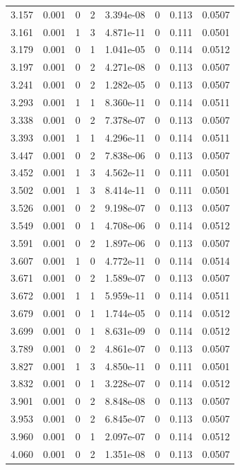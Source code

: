 \documentclass[preview]{standalone}
\begin{document}
{{{\begin{tabular}{L{1.2cm}C{1.2cm} C{0.3cm}C{0.5cm} C{1.4cm}C{1.4cm} C{1.4cm}C{1.4cm}}
  3.157  &  0.001  & 0     &  2 &  3.394e-08  & 0  & 0.113 &  0.0507   \\ 
  3.161  &  0.001  & 1     &  3 &  4.871e-11  & 0  & 0.111 &  0.0501   \\ 
  3.179  &  0.001  & 0     &  1 &  1.041e-05  & 0  & 0.114 &  0.0512   \\ 
  3.197  &  0.001  & 0     &  2 &  4.271e-08  & 0  & 0.113 &  0.0507   \\ 
  3.241  &  0.001  & 0     &  2 &  1.282e-05  & 0  & 0.113 &  0.0507   \\ 
  3.293  &  0.001  & 1     &  1 &  8.360e-11  & 0  & 0.114 &  0.0511   \\ 
  3.338  &  0.001  & 0     &  2 &  7.378e-07  & 0  & 0.113 &  0.0507   \\ 
  3.393  &  0.001  & 1     &  1 &  4.296e-11  & 0  & 0.114 &  0.0511   \\ 
  3.447  &  0.001  & 0     &  2 &  7.838e-06  & 0  & 0.113 &  0.0507   \\ 
  3.452  &  0.001  & 1     &  3 &  4.562e-11  & 0  & 0.111 &  0.0501   \\ 
  3.502  &  0.001  & 1     &  3 &  8.414e-11  & 0  & 0.111 &  0.0501   \\ 
  3.526  &  0.001  & 0     &  2 &  9.198e-07  & 0  & 0.113 &  0.0507   \\ 
  3.549  &  0.001  & 0     &  1 &  4.708e-06  & 0  & 0.114 &  0.0512   \\ 
  3.591  &  0.001  & 0     &  2 &  1.897e-06  & 0  & 0.113 &  0.0507   \\ 
  3.607  &  0.001  & 1     &  0 &  4.772e-11  & 0  & 0.114 &  0.0514   \\ 
  3.671  &  0.001  & 0     &  2 &  1.589e-07  & 0  & 0.113 &  0.0507   \\ 
  3.672  &  0.001  & 1     &  1 &  5.959e-11  & 0  & 0.114 &  0.0511   \\ 
  3.679  &  0.001  & 0     &  1 &  1.744e-05  & 0  & 0.114 &  0.0512   \\ 
  3.699  &  0.001  & 0     &  1 &  8.631e-09  & 0  & 0.114 &  0.0512   \\ 
  3.789  &  0.001  & 0     &  2 &  4.861e-07  & 0  & 0.113 &  0.0507   \\ 
  3.827  &  0.001  & 1     &  3 &  4.850e-11  & 0  & 0.111 &  0.0501   \\ 
  3.832  &  0.001  & 0     &  1 &  3.228e-07  & 0  & 0.114 &  0.0512   \\ 
  3.901  &  0.001  & 0     &  2 &  8.848e-08  & 0  & 0.113 &  0.0507   \\ 
  3.953  &  0.001  & 0     &  2 &  6.845e-07  & 0  & 0.113 &  0.0507   \\ 
  3.960  &  0.001  & 0     &  1 &  2.097e-07  & 0  & 0.114 &  0.0512   \\ 
  4.060  &  0.001  & 0     &  2 &  1.351e-08  & 0  & 0.113 &  0.0507   \\ 
\hline 
\end{tabular} 

}}}
\end{document}
